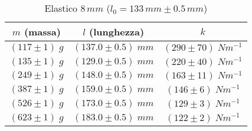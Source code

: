\begin{table}[h]
    \begin{tabular}{|c|c|c|}
        \hline
        $m$ (massa) & $l$ (lunghezza) & $k$\\
        \hline

        $(117 \pm 1)\; g$  & $(137.0 \pm 0.5) \;mm$ & $(290 \pm 70)\; Nm^{-1}$\\ 
        $(135 \pm 1)\; g$  & $(129.0 \pm 0.5) \;mm$ & $(220 \pm 40)\; Nm^{-1}$\\ 
        $(249 \pm 1)\; g$  & $(148.0 \pm 0.5) \;mm$ & $(163 \pm 11)\; Nm^{-1}$\\ 
        $(387 \pm 1)\; g$  & $(159.0 \pm 0.5) \;mm$ & $(146 \pm 6)\; Nm^{-1}$\\ 
        $(526 \pm 1)\; g$  & $(173.0 \pm 0.5) \;mm$ & $(129 \pm 3)\; Nm^{-1}$\\ 
        $(623 \pm 1)\; g$  & $(183.0 \pm 0.5) \;mm$ & $(122 \pm 2)\; Nm^{-1}$\\ 


        \hline
    \end{tabular}
    \caption{Elastico $8\,mm$ ($l_0 = 133\, mm \pm 0.5\,mm$)}
    \label{tabellaElasitco8}
\end{table}

